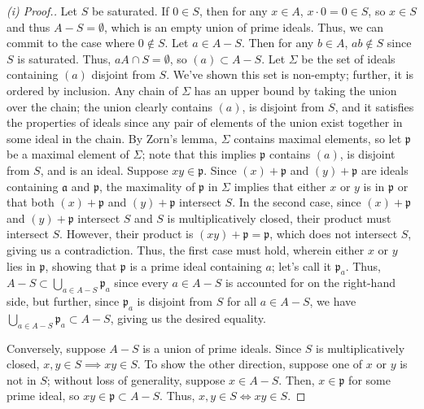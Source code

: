\begin{proof}[(i) Proof.]
Let $S$ be saturated. If $0 \in S$, then for any $x \in A$, $x \cdot 0 = 0 \in S$, so $x \in S$ and thus $A - S = \emptyset$, which is an empty union of prime ideals. Thus, we can commit to the case
where $0 \not\in S$. Let $a \in A - S$. Then for any $b \in A$, $ab \not\in S$ since $S$ is saturated. Thus, $aA \cap S = \emptyset$, so $(a) \subset A - S$. Let $\Sigma$ be the set of ideals containing $(a)$ 
disjoint from $S$. We've shown this set is non-empty; further, it is ordered by inclusion. Any chain of $\Sigma$ has an upper bound by taking the union over the chain; the union clearly contains $(a)$, is disjoint
from $S$, and it satisfies the properties of ideals since any pair of elements of the union exist together in some ideal in the chain. By Zorn's lemma, $\Sigma$ contains maximal elements, so let $\mathfrak{p}$ be 
a maximal element of $\Sigma$; note that this implies $\mathfrak{p}$ contains $(a)$, is disjoint from $S$, and is an ideal. Suppose $xy \in \mathfrak{p}$. Since $(x) + \mathfrak{p}$ and $(y) + \mathfrak{p}$ are ideals
containing $\mathfrak{a}$ and $\mathfrak{p}$, the maximality of $\mathfrak{p}$ in $\Sigma$ implies that either $x$ or $y$ is in $\mathfrak{p}$ or that both $(x) + \mathfrak{p}$ and $(y) + \mathfrak{p}$ intersect $S$.
In the second case, since $(x) + \mathfrak{p}$ and $(y) + \mathfrak{p}$ intersect $S$ and $S$ is multiplicatively closed, their product must intersect $S$. However, their product is $(xy) + \mathfrak{p} = \mathfrak{p}$, 
which does not intersect $S$, giving us a contradiction. Thus, the first case must hold, wherein either $x$ or $y$ lies in $\mathfrak{p}$, showing that $\mathfrak{p}$ is a prime ideal containing $a$; let's call it
$\mathfrak{p}_a$. Thus, $A - S \subset \bigcup_{a \in A-S}\mathfrak{p}_a$ since every $a \in A-S$ is accounted for on the right-hand side, but further, since $\mathfrak{p}_a$ is disjoint from $S$ for all $a \in A-S$, we have
$\bigcup_{a \in A-S}\mathfrak{p}_a \subset A - S$, giving us the desired equality.

Conversely, suppose $A - S$ is a union of prime ideals. Since $S$ is multiplicatively closed, $x,y \in S \implies xy \in S$. To show the other direction, suppose one of $x$ or $y$ is not in $S$; without loss of generality,
suppose $x \in A-S$. Then, $x \in \mathfrak{p}$ for some prime ideal, so $xy \in \mathfrak{p} \subset A - S$. Thus, $x,y \in S \iff xy \in S$.
\end{proof}

